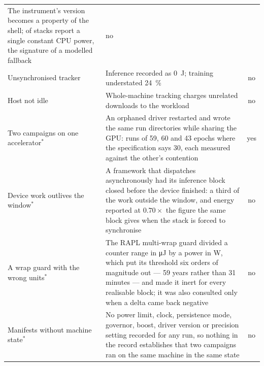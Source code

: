 \begin{table}[t]
\begin{tabularx}{\linewidth}{p{4.4cm}Xc}
The instrument's version becomes a property of the shell; \vAuditConstantCpuStacks{} of \vAuditStacks{} stacks report a single constant CPU power, the signature of a modelled fallback &
no \\
\addlinespace
Unsynchronised tracker &
Inference recorded as \SI{0}{\joule}; training understated \SI{24}{\percent} &
no \\
\addlinespace
Host not idle &
Whole-machine tracking charges unrelated downloads to the workload &
no \\
\addlinespace
Two campaigns on one accelerator$^\ast$ &
An orphaned driver restarted and wrote the same run directories while sharing
the GPU: runs of 59, 60 and 43 epochs where the specification says 30, each
measured against the other's contention &
yes \\
\addlinespace
Device work outlives the window$^\ast$ &
A framework that dispatches asynchronously had its inference block closed before
the device finished: a third of the work outside the window, and energy reported
at \(0.70\times\) the figure the same block gives when the stack is forced to
synchronise &
no \\
\addlinespace
A wrap guard with the wrong units$^\ast$ &
The RAPL multi-wrap guard divided a counter range in \si{\micro\joule} by a power
in \si{\watt}, which put its threshold six orders of magnitude out --- 59 years
rather than 31 minutes --- and made it inert for every realisable block; it was
also consulted only when a delta came back negative &
no \\
\addlinespace
Manifests without machine state$^\ast$ &
No power limit, clock, persistence mode, governor, boost, driver version or
precision setting recorded for any run, so nothing in the record establishes that
two campaigns ran on the same machine in the same state &
no \\
\bottomrule
\end{tabularx}
\end{table}

